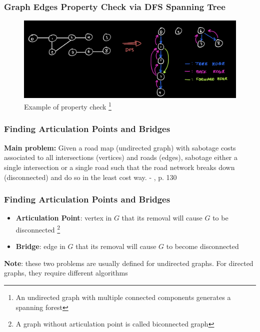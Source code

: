 \documentclass{beamer}
\begin{document}
\begin{frame}[fragile]
\frametitle{Graph Edges Property Check via DFS Spanning Tree}

\begin{figure}[H]
    \centering
    \includegraphics[scale=0.15]{imgs/graph_edge_property_check.jpeg}
    \caption{Example of property check \footnote{An undirected graph with multiple connected components generates a spanning forest}}
\end{figure}

\end{frame}

\begin{frame}[fragile]
\frametitle{Finding Articulation Points and Bridges}

\textbf{Main problem:} Given a road map (undirected graph) with sabotage costs associated to all intersections (vertices) and roads (edges), sabotage either a single intersection or a single road such that the road network breaks down (disconnected) and do so in the least cost way. - \cite{Halim}, p. 130

\end{frame}

\begin{frame}[fragile]
\frametitle{Finding Articulation Points and Bridges}

\begin{itemize}
    \item \textbf{Articulation Point}: vertex in $G$ that its removal will cause $G$ to be disconnected \footnote{A graph without articulation point is called biconnected graph}
    \item \textbf{Bridge}: edge in $G$ that its removal will cause $G$ to become disconnected
\end{itemize}
\pause

\vspace{0.3cm}

\textbf{Note}: these two problems are usually defined for undirected graphs. For directed graphs, they require different algorithms

\end{frame}
\end{document}
